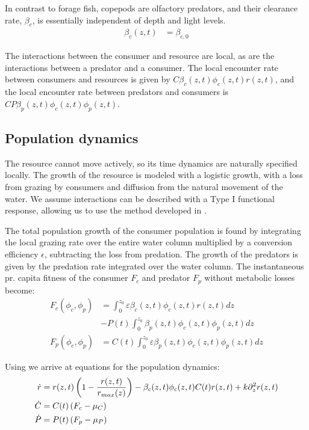 In contrast to forage fish, copepods are olfactory predators, and their clearance rate, $\beta_c$, is essentially independent of depth and light levels.
\begin{align*}
	\beta_c(z,t) &=  \beta_{c,0}
\end{align*}

The interactions between the consumer and resource are local, as are the interactions between a predator and a consumer. The local encounter rate between consumers and resources is given by $C\beta_c(z,t)\phi_c(z,t)r(z,t)$, and the local encounter rate between predators and consumers is $CP\beta_p(z,t)\phi_c(z,t)\phi_p(z,t)$.

\subsection{Population dynamics}

The resource cannot move actively, so its time dynamics are naturally specified locally. The growth of the resource is modeled with a logistic growth, with a loss from grazing by consumers and diffusion from the natural movement of the water. We assume interactions can be described with a Type I functional response, allowing us to use the method developed in . %


The total population growth of the consumer population is found by integrating the local grazing rate over the entire water column multiplied by a conversion efficiency $\epsilon$, subtracting the loss from predation. The growth of the predators is given by the predation rate integrated over the water column. The instantaneous pr. capita fitness of the consumer $F_c$ and predator $F_p$ without metabolic losses become:
\begin{align}
	F_c(\phi_c, \phi_p) &= \int_0^{z_0} \varepsilon \beta_c(z,t)\phi_c(z,t)r(z,t) dz\\ &- P(t)\int_0^{z_0} \beta_p(z,t) \phi_c(z,t) \phi_p(z,t)dz \\
	F_p(\phi_c, \phi_p) &=  C(t) \int_0^{z_0} \varepsilon \beta_p(z,t)\phi_c(z,t)\phi_p(z,t) dz
  \label{eq:fitness}
\end{align}

Using  we arrive at equations for the population dynamics:
\begin{align}
	\dot{r} &= r(z,t)\pa{1-\frac{r(z,t)}{r_{max}(z)}} - \beta_c(z,t)\phi_c(z,t)C(t) r(z,t)  + k \partial_z^2 r(z,t) \\
  \label{eq:res_dyn}
	\dot{C} &= C(t)\left ( F_c - \mu_C \right ) \\
	\dot{P} &= P(t) \left ( F_p - \mu_P  \right )
  \label{eq:population_growth_prob_dens}
\end{align}

